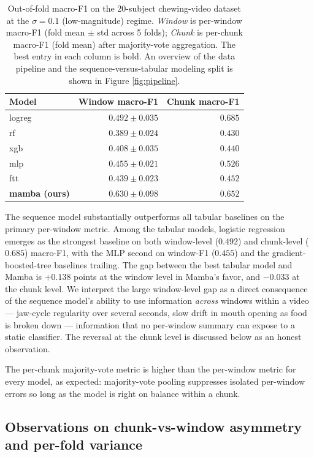 \documentclass{article}
\begin{document}
\begin{table}[htbp]
\centering
\caption{Out-of-fold macro-F1 on the 20-subject chewing-video dataset at the $\sigma = 0.1$ (low-magnitude) regime. \emph{Window} is per-window macro-F1 (fold mean $\pm$ std across 5 folds); \emph{Chunk} is per-chunk macro-F1 (fold mean) after majority-vote aggregation. The best entry in each column is bold. An overview of the data pipeline and the sequence-versus-tabular modeling split is shown in Figure \ref{fig:pipeline}.}
\label{tab:main}
\begin{tabular}{l r r}
\toprule
Model & Window macro-F1 & Chunk macro-F1 \\
\midrule
logreg & $0.492 \pm 0.035$ & $\mathbf{0.685}$ \\
rf & $0.389 \pm 0.024$ & $0.430$ \\
xgb & $0.408 \pm 0.035$ & $0.440$ \\
mlp & $0.455 \pm 0.021$ & $0.526$ \\
ftt & $0.439 \pm 0.023$ & $0.452$ \\
\textbf{mamba (ours)} & $\mathbf{0.630 \pm 0.098}$ & $0.652$ \\
\bottomrule
\end{tabular}
\end{table}

The sequence model substantially outperforms all tabular baselines on the primary per-window metric. Among the tabular models, logistic regression emerges as the strongest baseline on both window-level ($0.492$) and chunk-level ($0.685$) macro-F1, with the MLP second on window-F1 ($0.455$) and the gradient-boosted-tree baselines trailing. The gap between the best tabular model and Mamba is $+0.138$ points at the window level in Mamba's favor, and $-0.033$ at the chunk level. We interpret the large window-level gap as a direct consequence of the sequence model's ability to use information \emph{across} windows within a video --- jaw-cycle regularity over several seconds, slow drift in mouth opening as food is broken down --- information that no per-window summary can expose to a static classifier. The reversal at the chunk level is discussed below as an honest observation.

The per-chunk majority-vote metric is higher than the per-window metric for every model, as expected: majority-vote pooling suppresses isolated per-window errors so long as the model is right on balance within a chunk.

\subsection{Observations on chunk-vs-window asymmetry and per-fold variance}
\end{document}
